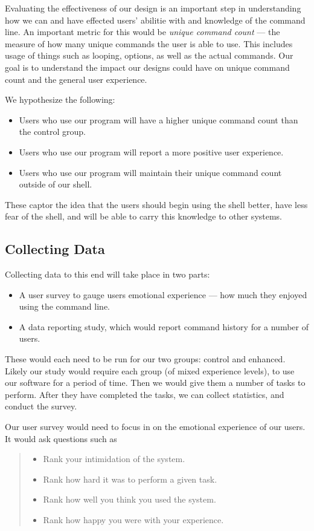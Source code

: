 Evaluating the effectiveness of our design is an important step in understanding
how we can and have effected users' abilitie with and knowledge of the command
line. An important metric for this would be \emph{unique command count} --- the
measure of how many unique commands the user is able to use. This includes
usage of things such as looping, options, as well as the actual commands. Our
goal is to understand the impact our designs could have on unique command count
and the general user experience.

We hypothesize the following:
\begin{itemize}
  \item Users who use our program will have a higher unique command count than
  the control group.
  \item Users who use our program will report a more positive user experience.
  \item Users who use our program will maintain their unique command count
  outside of our shell.
\end{itemize}
These captor the idea that the users should begin using the shell better, have
less fear of the shell, and will be able to carry this knowledge to other
systems.

\subsection{Collecting Data}
Collecting data to this end will take place in two parts:
\begin{itemize}
  \item A user survey to gauge users emotional experience --- how much they
  enjoyed using the command line.
  \item A data reporting study, which would report command history for a number
  of users.
\end{itemize}
These would each need to be run for our two groups: control and enhanced. Likely
our study would require each group (of mixed experience levels), to use our
software for a period of time. Then we would give them a number of tasks to
perform. After they have completed the tasks, we can collect statistics, and
conduct the survey.

Our user survey would need to focus in on the emotional experience of our
users. It would ask questions such as
\begin{quote}
  \begin{itemize}
    \item Rank your intimidation of the system.
    \item Rank how hard it was to perform a given task.
    \item Rank how well you think you used the system.
    \item Rank how happy you were with your experience.
  \end{itemize}
\end{quote}

